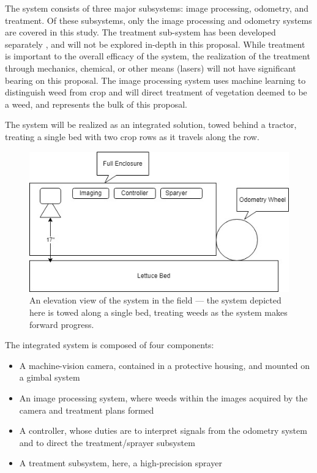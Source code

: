 \documentclass[12pt]{article}
\begin{document}
{The system consists of three major subsystems: image processing, odometry, and treatment. Of these subsystems, only the image processing and odometry systems are covered in this study. The treatment sub-system has been developed separately \cite{Siemens2020-ds}, and will not be explored in-depth in this proposal. While treatment is important to the overall efficacy of the system, the realization of the treatment through mechanics, chemical, or other means (lasers) will not have significant bearing on this proposal. The image processing system uses machine learning to distinguish weed from crop and will direct treatment of vegetation deemed to be a weed, and represents the bulk of this proposal. 

The system will be realized as an integrated solution, towed behind a tractor, treating a single bed with two crop rows as it travels along the row.
\begin{figure}[H]
	\centering
	\includegraphics[width=0.4\linewidth]{./figures/system-in-field.jpg}
	\caption[An elevation view of the system in the field]{An elevation view of the system in the field --- the system depicted here is towed along a single bed, treating weeds as the system makes forward progress.}
	\label{fig:system-in-field}
\end{figure}

The integrated system is composed of four components:
\begin{itemize}
\item{A machine-vision camera, contained in a protective housing, and mounted on a gimbal system}
\item{An image processing system, where weeds within the images acquired by the camera and treatment plans formed}
\item{A controller, whose duties are to interpret signals from the odometry system and to direct the treatment/sprayer subsystem}
\item{A treatment subsystem, here, a high-precision sprayer}
\end{itemize}

}
\end{document}
